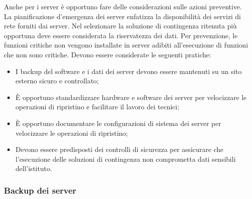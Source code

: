 \documentclass[12pt, a4paper, titlepage]{report}
\begin{document}
	Anche per i server è opportuno fare delle considerazioni sulle azioni preventive. La pianificazione d'emergenza dei server enfatizza la disponibilità dei servizi di rete forniti dai server. Nel selezionare la soluzione di contingenza ritenuta più opportuna deve essere considerata la riservatezza dei dati. Per prevenzione, le funzioni critiche non vengono installate in server adibiti all'esecuzione di funzioni che non sono critiche. Devono essere considerate le seguenti pratiche:
	\begin{itemize}
		\item I backup del software e i dati dei server devono essere mantenuti su un sito esterno sicuro e controllato;
		\item È opportuno standardizzare hardware e software dei server per velocizzare le operazioni di ripristino e facilitare il lavoro dei tecnici;
		\item È opportuno documentare le configurazioni di sistema dei server per velocizzare le operazioni di ripristino;
		\item Devono essere predisposti dei controlli di sicurezza per assicurare che l'esecuzione delle soluzioni di contingenza non comprometta dati sensibili dell'istituto.
	\end{itemize}
	\subsubsection{Backup dei server}
	
\end{document}
